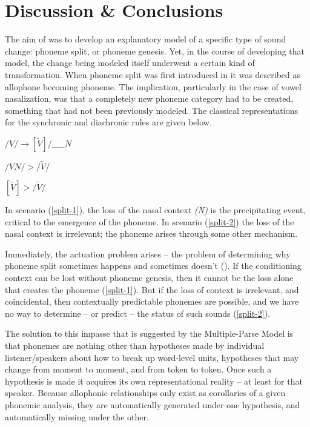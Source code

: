 \chapter{Discussion \& Conclusions}\label{ch:Summary}

The aim of  was to develop an explanatory
model of a specific type of sound change: phoneme split, or phoneme
genesis. Yet, in the course of developing that model, the change being
modeled itself underwent a certain kind of transformation. When phoneme
split was first introduced in  it was
described as allophone becoming phoneme. The implication, particularly
in the case of vowel nasalization, was that a completely new phoneme
category had to be created, something that had not been previously
modeled. The classical representations for the synchronic and diachronic
rules are given below.
\begin{covexample}
\label{allophonic rule}$/V/\rightarrow[\tilde{V}]/$\_\_$N$
\end{covexample}
\begin{covsubexamples}
\item \label{split-1}$/VN/>/\tilde{V}/$
\item \label{split-2}$[\tilde{V}]>/\tilde{V}/$
\end{covsubexamples}
In scenario (\ref{split-1}), the loss of the nasal context \emph{(N)}
is the precipitating event, critical to the emergence of the phoneme.
In scenario (\ref{split-2}) the loss of the nasal context is irrelevant;
the phoneme arises through some other mechanism.

Immediately, the actuation problem arises – the problem of determining
why phoneme split sometimes happens and sometimes doesn't (\citealt{Labov1968}).
If the conditioning context can be lost without phoneme genesis, then
it cannot be the loss alone that creates the phoneme (\ref{split-1}).
But if the loss of context is irrelevant, and coincidental, then contextually
predictable phonemes are possible, and we have no way to determine
– or predict – the status of such sounds (\ref{split-2}).

The solution to this impasse that is suggested by the Multiple-Parse
Model is that phonemes are nothing other than hypotheses made by individual
listener/speakers about how to break up word-level units, hypotheses
that may change from moment to moment, and from token to token. Once
such a hypothesis is made it acquires its own representational reality
– at least for that speaker. Because allophonic relationships only
exist as corollaries of a given phonemic analysis, they are automatically
generated under one hypothesis, and automatically missing under the
other. 

